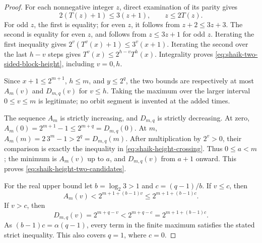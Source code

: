 \documentclass[11pt]{article}
\theoremstyle{remark}\newtheorem{remark}[proposition]{Remark}
\begin{document}
\begin{proof}
For each nonnegative integer \(z\), direct examination of its parity gives
\[
 2(T(z)+1)\le3(z+1),\qquad z\le2T(z).
\]
For odd \(z\), the first is equality; for even \(z\), it follows from
\(z+2\le3z+3\). The second is equality for even \(z\), and follows from
\(z\le3z+1\) for odd \(z\). Iterating the first inequality gives
\(2^v(T^v(x)+1)\le3^v(x+1)\). Iterating the second over the last
\(h-v\) steps gives \(T^v(x)\le2^{h-v}T^h(x)\). Integrality proves
\eqref{eq:shaik-two-sided-block-height}, including \(v=0,h\).

Since \(x+1\le2^{m+1}\), \(h\le m\), and \(y\le2^q\), the two bounds
are respectively at most \(A_m(v)\) and \(D_{m,q}(v)\) for \(v\le h\).
Taking the maximum over the larger interval \(0\le v\le m\) is legitimate;
no orbit segment is invented at the added times.

The sequence \(A_m\) is strictly increasing, and \(D_{m,q}\) is strictly
decreasing. At zero, \(A_m(0)=2^{m+1}-1\le2^{m+q}=D_{m,q}(0)\).
At \(m\), \(A_m(m)=2\,3^m-1>2^q=D_{m,q}(m)\).
After multiplication by \(2^v>0\), their comparison is exactly the
inequality in \eqref{eq:shaik-height-crossing}. Thus \(0\le a<m\);
the minimum is \(A_m(v)\) up to \(a\), and \(D_{m,q}(v)\) from \(a+1\)
onward. This proves \eqref{eq:shaik-height-two-candidates}.

For the real upper bound let \(b=\log_2 3>1\) and \(c=(q-1)/b\).
If \(v\le c\), then
\[
 A_m(v)<2^{m+1+(b-1)v}\le2^{m+1+(b-1)c}.
\]
If \(v>c\), then
\[
 D_{m,q}(v)=2^{m+q-v}<2^{m+q-c}
                    =2^{m+1+(b-1)c}.
\]
As \((b-1)c=\alpha(q-1)\), every term in the finite maximum satisfies
the stated strict inequality. This also covers \(q=1\), where \(c=0\).
\end{proof}
\end{document}
